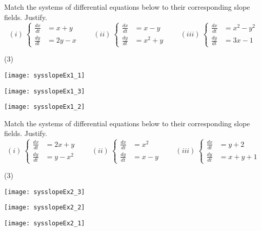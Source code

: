 \documentclass{ximera}
\begin{document}
\begin{exercise}%
    Match the systems of differential equations below to their corresponding slope fields. Justify.
    \begin{equation*}
        (i)\ 
        \begin{cases} 
            \frac{dx}{dt} &= x+y \\ 
            \frac{dy}{dt} &= 2y-x 
        \end{cases} 
        \qquad (ii)\ 
        \begin{cases} 
            \frac{dx}{dt} &= x-y \\ 
            \frac{dy}{dt} &= x^2 + y 
        \end{cases} 
        \qquad (iii)\ 
        \begin{cases} 
            \frac{dx}{dt} &= x^2 - y^2 \\ 
            \frac{dy}{dt} &= 3x-1 
        \end{cases}
    \end{equation*}
    \begin{tasks}(3)
        \task \parbox[c]{2in}{\texttt{[image: sysslopeEx1\_1]}}
        \task \parbox[c]{2in}{\texttt{[image: sysslopeEx1\_3]}}
        \task \parbox[c]{2in}{\texttt{[image: sysslopeEx1\_2]}}
    \end{tasks}
\end{exercise}

\begin{exercise}
    Match the systems of differential equations below to their corresponding slope fields. Justify.
    \begin{equation*}
        (i)\ 
        \begin{cases} 
            \frac{dx}{dt} &= 2x+y \\ 
            \frac{dy}{dt} &= y - x^2 
        \end{cases} 
        \qquad (ii)\ 
        \begin{cases} 
            \frac{dx}{dt} &= x^2 \\ 
            \frac{dy}{dt} &= x-y 
        \end{cases} 
        \qquad (iii)\ 
        \begin{cases} 
            \frac{dx}{dt} &= y+2 \\ 
            \frac{dy}{dt} &= x+y+1 
        \end{cases}
    \end{equation*}
    \begin{tasks}(3)
        \task \parbox[c]{2in}{\texttt{[image: sysslopeEx2\_3]}}
        \task \parbox[c]{2in}{\texttt{[image: sysslopeEx2\_2]}}
        \task \parbox[c]{2in}{\texttt{[image: sysslopeEx2\_1]}}
    \end{tasks}
\end{exercise}
\end{document}
